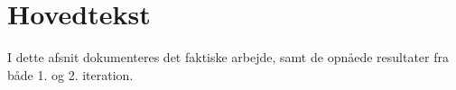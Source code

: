 \section{Hovedtekst}
I dette afsnit dokumenteres det faktiske arbejde, samt de opnåede resultater fra både 1. og 2. iteration.










